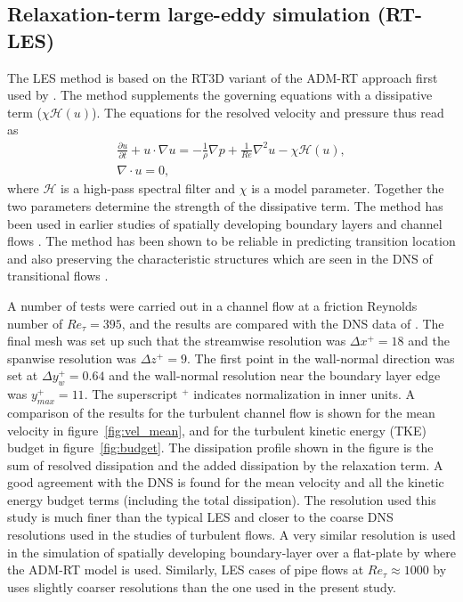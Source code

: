 \subsection{Relaxation-term large-eddy simulation (RT-LES)}

The LES method is based on the RT3D variant of the ADM-RT approach first used by \cite{schlatter04}. The method supplements the governing equations with a dissipative term ($\chi\mathcal{H}(u)$). The equations for the resolved velocity and pressure thus read as
\begin{subequations}
	\begin{eqnarray}
		\frac{\partial u}{\partial t} + u\cdot\nabla u =  - \frac{1}{\rho}\nabla p + \frac{1}{Re}\nabla^{2}u -\chi\mathcal{H}(u), \\
		\nabla\cdot u = 0,
	\end{eqnarray}
\end{subequations}
where $\mathcal{H}$ is a high-pass spectral filter and $\chi$ is a model parameter. Together the two parameters determine the strength of the dissipative term. The method has been used in earlier studies of spatially developing boundary layers \citep{eitel14} and channel flows \citep{schlatter06}. The method has been shown to be reliable in predicting transition location and also preserving the characteristic structures which are seen in the DNS of transitional flows \citep{schlatter06}.

A number of tests were carried out in a channel flow at a friction Reynolds number of $Re_{\tau}=395$, and the results are compared with the DNS data of \cite{moser99}. The final mesh was set up such that the streamwise resolution was $\Delta x^{+}=18$ and the spanwise resolution was $\Delta z^{+}=9$. The first point in the wall-normal direction was set at $\Delta y_{w}^{+}=0.64$ and the wall-normal resolution near the boundary layer edge was $y_{max}^{+}=11$. The superscript $^{+}$ indicates normalization in inner units. A comparison of the results for the turbulent channel flow is shown for the mean velocity in figure~\ref{fig:vel_mean}, and for the turbulent kinetic energy (TKE) budget in figure~\ref{fig:budget}. The dissipation profile shown in the figure is the sum of resolved dissipation and the added dissipation by the relaxation term. A good agreement with the DNS is found for the mean velocity and all the kinetic energy budget terms (including the total dissipation). The resolution used this study is much finer than the typical LES and closer to the coarse DNS resolutions used in the studies of turbulent flows. A very similar resolution is used in the simulation of spatially developing boundary-layer over a flat-plate by \cite{eitel14} where the ADM-RT model is used. Similarly, LES cases of pipe flows at $Re_{\tau}\approx1000$ by \cite{chin15} uses slightly coarser resolutions than the one used in the present study.

